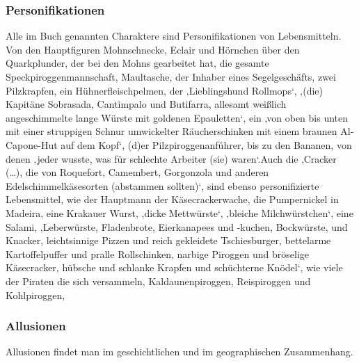 \subsubsection{Personifikationen}

Alle im Buch genannten Charaktere sind Personifikationen von Lebensmitteln. Von den Hauptfiguren Mohnschnecke,\cite[S.13]{pir} Eclair \cite[S.15]{pir} und Hörnchen \cite[S.25]{pir} über den Quarkplunder, der bei den Mohns gearbeitet hat,\cite[S.15]{pir} die gesamte Speckpiroggenmannschaft,\cite[S.47ff]{pir} Maultasche,\cite[S.108]{pir} der Inhaber eines Segelgeschäfts,\cite[S.107f]{pir} zwei Pilzkrapfen,\cite[S.113]{pir} ein Hühnerfleischpelmen,\cite[S.116]{pir} der ‚Lieblingshund Rollmops‘,\cite[S.117]{pir} ‚(die) Kapitäne Sobrasada, Cantimpalo und Butifarra, allesamt weißlich angeschimmelte lange Würste mit goldenen Epauletten‘,\cite[S.253]{pir} ein ‚von oben bis unten mit einer struppigen Schnur umwickelter Räucherschinken mit einem braunen Al-Capone-Hut auf dem Kopf‘,\cite[S.291]{pir} (d)er Pilzpiroggenanführer,\cite[S.318]{pir} bis zu den Bananen,\cite[S.385]{pir} von denen ‚jeder wusste, was für schlechte Arbeiter (sie) waren‘.\cite[S.385]{pir}Auch die  ‚Cracker (…), die von Roquefort, Camembert, Gorgonzola und anderen Edelschimmelkäsesorten (abstammen sollten)‘,\cite[S.140]{pir} sind ebenso personifizierte Lebensmittel, wie der Hauptmann der Käsecrackerwache,\cite[S.143]{pir} die Pumpernickel in Madeira,\cite[S.195]{pir} eine Krakauer Wurst,\cite[S.285]{pir} ‚dicke Mettwürste‘,\cite[S.291]{pir} ‚bleiche Milchwürstchen‘,\cite[S.291]{pir} eine Salami,\cite[S.291]{pir} ‚Leberwürste, Fladenbrote, Eierkanapees und -kuchen, Bockwürste, und Knacker, leichtsinnige Pizzen und reich gekleidete Tschiesburger, bettelarme Kartoffelpuffer und pralle Rollschinken, narbige Piroggen und bröselige Käsecracker, hübsche und schlanke Krapfen und schüchterne Knödel‘,\cite[S.382]{pir} wie viele der Piraten die sich versammeln, Kaldaunenpiroggen,\cite[S.420]{pir} Reispiroggen \cite[S.420]{pir} und Kohlpiroggen,\cite[S.420]{pir}


\subsubsection{Allusionen}

Allusionen findet man im geschichtlichen und im geographischen Zusammenhang.

